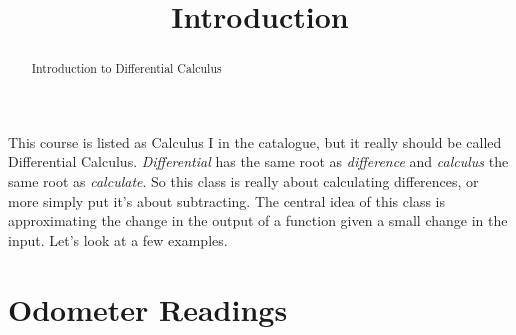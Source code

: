 \documentclass{ximera}
\title{Introduction}
\begin{document}
\begin{abstract}
Introduction to Differential Calculus
\end{abstract}
\maketitle


This course is listed as Calculus I in the catalogue, but it really should be called Differential Calculus. \emph{Differential} has the same root as \emph{difference} and \emph{calculus} the same root as \emph{calculate}. So this class is really about calculating differences, or more simply put it's about subtracting. The central idea of this class is approximating the change in the output of a function given a small change in the input. Let's look at a few examples.

\section{Odometer Readings}
\end{document}
